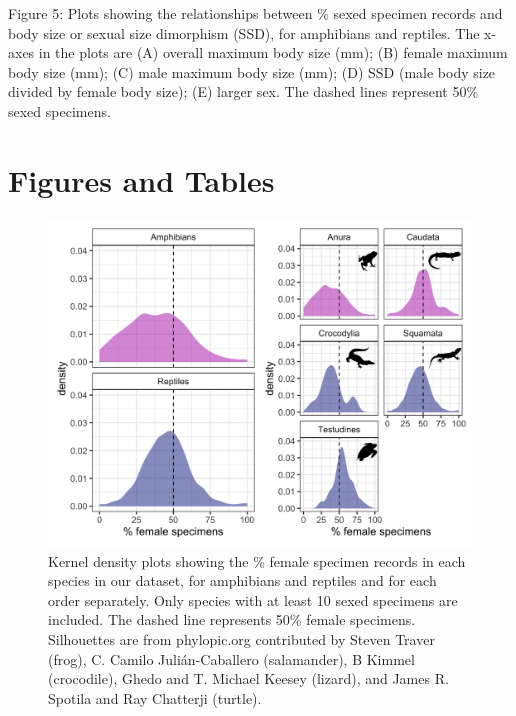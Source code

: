 \documentclass[a4paper, 12pt]{article}
\begin{document}
Figure 5: Plots showing the relationships between \% sexed specimen records and body size or sexual size dimorphism (SSD), for amphibians and reptiles. The x-axes in the plots are (A) overall maximum body size (mm); (B) female maximum body size (mm); (C) male maximum body size (mm); (D) SSD (male body size divided by female body size); (E) larger sex. The dashed lines represent 50\% sexed specimens. 

\newpage
\section{Figures and Tables}



\newpage
\begin{figure}[h]
 \centering
  \includegraphics[width = \linewidth]{figures/class-order-density.png}
  \caption{Kernel density plots showing the \% female specimen records in each species in our dataset, for amphibians and reptiles and for each order separately. Only species with at least 10 sexed specimens are included. The dashed line represents 50\% female specimens. Silhouettes are from phylopic.org contributed by Steven Traver (frog), C. Camilo Julián-Caballero (salamander), B Kimmel (crocodile), Ghedo and T. Michael Keesey (lizard), and James R. Spotila and Ray Chatterji (turtle).}
  \label{fig-females}
\end{figure}
\end{document}
